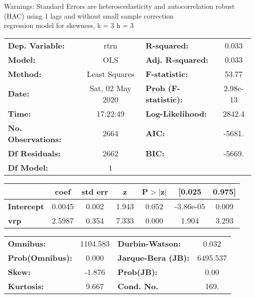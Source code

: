 Warnings: \newline
 [1] Standard Errors are heteroscedasticity and autocorrelation robust (HAC) using 1 lags and without small sample correction\\ 

regression model for skewness, k = 3 h = 3\begin{center}
\begin{tabular}{lclc}
\toprule
\textbf{Dep. Variable:}    &       rtrn       & \textbf{  R-squared:         } &     0.033   \\
\textbf{Model:}            &       OLS        & \textbf{  Adj. R-squared:    } &     0.033   \\
\textbf{Method:}           &  Least Squares   & \textbf{  F-statistic:       } &     53.77   \\
\textbf{Date:}             & Sat, 02 May 2020 & \textbf{  Prob (F-statistic):} &  2.98e-13   \\
\textbf{Time:}             &     17:22:49     & \textbf{  Log-Likelihood:    } &    2842.4   \\
\textbf{No. Observations:} &        2664      & \textbf{  AIC:               } &    -5681.   \\
\textbf{Df Residuals:}     &        2662      & \textbf{  BIC:               } &    -5669.   \\
\textbf{Df Model:}         &           1      & \textbf{                     } &             \\
\bottomrule
\end{tabular}
\begin{tabular}{lcccccc}
                   & \textbf{coef} & \textbf{std err} & \textbf{z} & \textbf{P$> |$z$|$} & \textbf{[0.025} & \textbf{0.975]}  \\
\midrule
\textbf{Intercept} &       0.0045  &        0.002     &     1.943  &         0.052        &    -3.86e-05    &        0.009     \\
\textbf{vrp}       &       2.5987  &        0.354     &     7.333  &         0.000        &        1.904    &        3.293     \\
\bottomrule
\end{tabular}
\begin{tabular}{lclc}
\textbf{Omnibus:}       & 1104.583 & \textbf{  Durbin-Watson:     } &    0.032  \\
\textbf{Prob(Omnibus):} &   0.000  & \textbf{  Jarque-Bera (JB):  } & 6495.537  \\
\textbf{Skew:}          &  -1.876  & \textbf{  Prob(JB):          } &     0.00  \\
\textbf{Kurtosis:}      &   9.667  & \textbf{  Cond. No.          } &     169.  \\
\bottomrule
\end{tabular}
\end{center}


